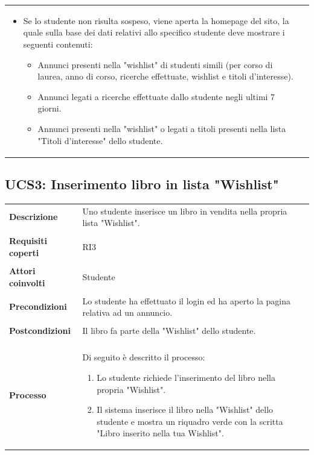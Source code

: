 \documentclass[10pt,a4paper]{report}
\begin{document}
\begin{tabular}{lp{}}
\begin{enumerate}
\begin{itemize}
\begin{itemize}
					\item Se lo studente non risulta sospeso, viene aperta la homepage del sito, la quale sulla base dei dati relativi allo specifico studente deve mostrare i seguenti contenuti:
					\begin{itemize}
						\item Annunci presenti nella "wishlist" di studenti simili (per corso di laurea, anno di corso, ricerche effettuate, wishlist e titoli d'interesse).
						\item Annunci legati a ricerche effettuate dallo studente negli ultimi 7 giorni.
						\item Annunci presenti nella "wishlist" o legati a titoli presenti nella lista "Titoli d'interesse" dello studente.
					\end{itemize}
				\end{itemize}
			\end{itemize} 
		\end{enumerate}
	\end{tabular}

	\subsection{UCS3: Inserimento libro in lista "Wishlist"}
	\begin{tabular}{lp{}}
		\textbf{Descrizione}&Uno studente inserisce un libro in vendita nella propria lista "Wishlist".\\
		\\
		\textbf{Requisiti coperti}&RI3\\
		\\
		\textbf{Attori coinvolti}&Studente\\
		\\
		\textbf{Precondizioni}&Lo studente ha effettuato il login ed ha aperto la pagina relativa ad un annuncio.\\
		\\
		\textbf{Postcondizioni}&Il libro fa parte della "Wishlist" dello studente.\\
		\\
		\textbf{Processo}&Di seguito è descritto il processo:
		\begin{enumerate}
			\item Lo studente richiede l'inserimento del libro nella propria "Wishlist".
			\item Il sistema inserisce il libro nella "Wishlist" dello studente e mostra un riquadro verde con la scritta "Libro inserito nella tua Wishlist".
		\end{enumerate}
	\end{tabular}
\end{document}

